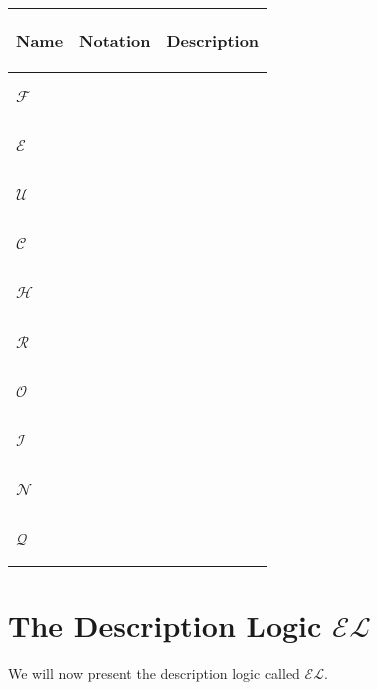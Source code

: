 \begin{table}[!h]
    \centering
    \hspace*{\fill}
    \begin{tabular}{p{}p{}p{}}
        \toprule
        \begin{center}\textbf{Name}\end{center} & \begin{center}\textbf{Notation}\end{center} & \begin{center}\textbf{Description}\end{center} \\
        \midrule
        \begin{center}$\mathcal{F}$\end{center} &  &  \\
        \hline 
        \begin{center}$\mathcal{E}$\end{center} &  &  \\
        \hline 
        \begin{center}$\mathcal{U}$\end{center} &  &  \\
        \hline
        \begin{center}$\mathcal{C}$\end{center} &  &  \\
        \hline 
        \begin{center}$\mathcal{H}$\end{center} &  &  \\
        \hline 
        \begin{center}$\mathcal{R}$\end{center} &  &  \\
        \hline 
        \begin{center}$\mathcal{O}$\end{center} &  &  \\
        \hline 
        \begin{center}$\mathcal{I}$\end{center} &  &  \\
        \hline 
        \begin{center}$\mathcal{N}$\end{center} &  &  \\
        \hline 
        \begin{center}$\mathcal{Q}$\end{center} &  &  \\
    \end{tabular}
\end{table}

\section{The Description Logic $\mathcal{EL}$}

We will now present the description logic called $\mathcal{EL}$. 



